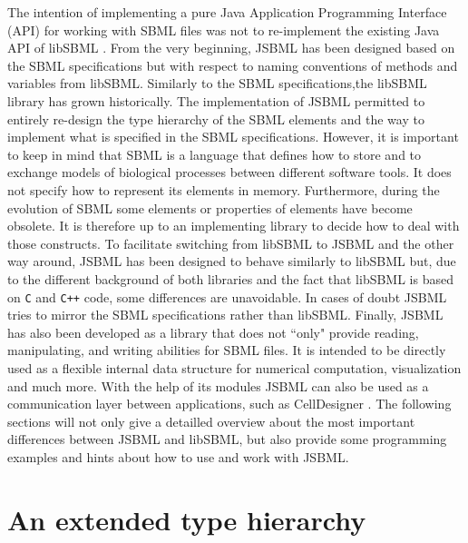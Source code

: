 \documentclass[
  BCOR12mm,
  letterpaper,
  11pt,
  headsepline,
  pointlessnumbers,
  tablecaptionabove,
  onelinecaption,
  headinclude,
  appendixprefix,
  idxtotoc,
  bibtotoc,
  twoside,
  titlepage
]{scrartcl}
\begin{document}
The intention of implementing a pure Java\texttrademark{}
Application Programming Interface (API) for working with SBML files was not to
re-implement the existing Java API of libSBML \citep{Bornstein2008}.
From the very beginning, JSBML
has been designed based on the SBML specifications \citep{Hucka2003, Hucka2008,
Hucka2010a} but with respect to naming conventions of methods and variables from
libSBML. Similarly to the SBML specifications,the 
libSBML library has grown
historically. The implementation of JSBML permitted to entirely
re-design the type hierarchy of the SBML elements and the way to
implement what is specified in the SBML specifications. However, it is important 
to keep in mind that SBML is a
language that defines how to store and to exchange models of biological
processes between different software tools. It
does not specify how to represent its elements in memory. Furthermore, during 
the evolution of SBML some elements or properties of elements have become
obsolete.
It is therefore up to an implementing library to
decide how to deal with those constructs. To facilitate switching from libSBML
to JSBML and the other way around, JSBML has been designed to behave similarly
to libSBML but, due to the different background of both libraries and the fact
that libSBML is based on \texttt{C}
and \texttt{C++} code, some differences are
unavoidable. In cases of doubt JSBML tries to mirror the SBML specifications
rather than libSBML. Finally, JSBML has also been developed as a library that
does not ``only" provide reading, manipulating, and writing abilities for SBML
files. It is intended to be directly used as a flexible internal data structure
for numerical computation, visualization and much more. With the help of its
modules JSBML can also be used as a communication layer between applications,
such as CellDesigner \citep{Funahashi2003}. The
following sections will not only give a detailled overview about the most
important differences between JSBML and libSBML, but also provide some programming
examples and hints about how to use and work with JSBML.


\section{An extended type hierarchy}
\end{document}
